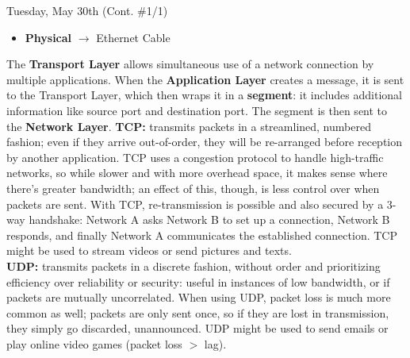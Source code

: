 \documentclass[11pt]{article}
\begin{document}
\begin{bloodorangebox}{Tuesday, May 30th (Cont. \#1/1)}
\begin{multicols}{2}
\begin{itemize}
            \vspace{-0.2cm}\item\textbf{Physical} $\longrightarrow$ Ethernet Cable
        \end{itemize}
        The \textbf{Transport Layer} allows simultaneous use of a network connection by multiple applications. When the \textbf{Application Layer} creates a message, it is sent to the Transport Layer, which then wraps it in a \textbf{segment}: it includes additional information like source port and destination port. The segment is then sent to the \textbf{Network Layer}.
        \vfill
        \columnbreak
        \scriptsize\textbf{TCP:} transmits packets in a streamlined, numbered fashion; even if they arrive out-of-order, they will be re-arranged before reception by another application. TCP uses a congestion protocol to handle high-traffic networks, so while slower and with more overhead space, it makes sense where there's greater bandwidth; an effect of this, though, is less control over when packets are sent. With TCP, re-transmission is possible and also secured by a 3-way handshake: Network A asks Network B to set up a connection, Network B responds, and finally Network A communicates the established connection. TCP might be used to stream videos or send pictures and texts. \\
        \hline
        \vspace{0.75em}
        \scriptsize\textbf{UDP:} transmits packets in a discrete fashion, without order and prioritizing efficiency over reliability or security: useful in instances of low bandwidth, or if packets are mutually uncorrelated. When using UDP, packet loss is much more common as well; packets are only sent once, so if they are lost in transmission, they simply go discarded, unannounced. UDP might be used to send emails or play online video games (packet loss $>$ lag).
    \end{multicols}
\end{bloodorangebox}

\begin{center}
\vspace{-0.5em}
\end{center}
\end{document}
